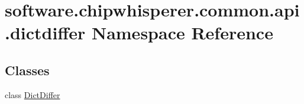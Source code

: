 \hypertarget{namespacesoftware_1_1chipwhisperer_1_1common_1_1api_1_1dictdiffer}{}\section{software.\+chipwhisperer.\+common.\+api.\+dictdiffer Namespace Reference}
\label{namespacesoftware_1_1chipwhisperer_1_1common_1_1api_1_1dictdiffer}
\subsection*{Classes}
\begin{DoxyCompactItemize}
\item 
class \hyperlink{classsoftware_1_1chipwhisperer_1_1common_1_1api_1_1dictdiffer_1_1DictDiffer}{Dict\+Differ}
\end{DoxyCompactItemize}
